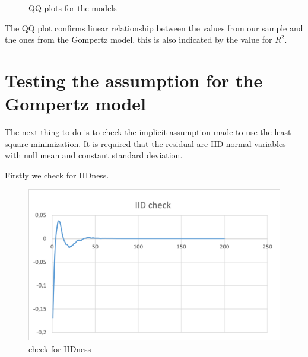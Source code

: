 \begin{figure}[H]
    \centering
    \qquad
    \caption{QQ plots for the models}
\end{figure}




The QQ plot confirms linear relationship between the values from our sample and the ones from the Gompertz model, this is also indicated by the value for $R^2$.

\section{Testing the assumption for the Gompertz model}
The next thing to do is to check the implicit assumption made to use the least square minimization. It is required that the residual are IID normal variables with null mean and constant standard deviation.

Firstly we check for IIDness.
\begin{figure}[H]
\centering
    \includegraphics[width= 1\textwidth]{./images/IIDcheck200.png}
    \caption{check for IIDness}
    \label{fig:IIDCheckGompertz}
\end{figure}

